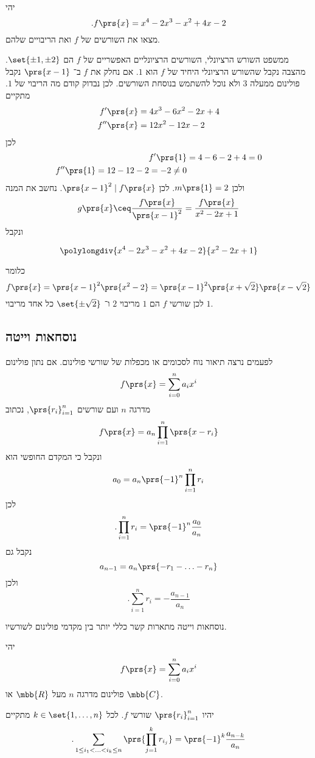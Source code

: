 \documentclass[article, 10pt,oneside]{article}
\begin{document}
\begin{exercise}
יהי
\[\text{.} f\prs{x} = x^4 - 2x^3 - x^2 + 4x - 2\]
מצאו את השורשים של
$f$
ואת הריבויים שלהם.
\end{exercise}

\begin{solution}
ממשפט השורש הרציונלי, השורשים הרציונליים האפשריים של
$f$
הם
$\set{\pm 1, \pm 2}$.
מהצבה נקבל שהשורש הרציונלי היחיד של
$f$
הוא
$1$.
אם נחלק את
$f$
ב־%
$\prs{x-1}$
נקבל פולינום ממעלה
$3$
ולא נוכל להשתמש בנוסחת השורשים. לכן נבדוק קודם מה הריבוי של
$1$.
מתקיים
\begin{align*}
f'\prs{x} &= 4x^3 -6x^2 -2x + 4 \\
f''\prs{x} &= 12x^2 - 12x - 2
\end{align*}
לכן
\begin{align*}
f'\prs{1} &= 4-6-2 + 4 = 0 \\
f''\prs{1} = 12 - 12 - 2 = -2 \neq 0
\end{align*}
ולכן
$m\prs{1} = 2$.
לכן
$\prs{x-1}^2 \mid f\prs{x}$.
נחשב את המנה
\[g\prs{x} \ceq \frac{f\prs{x}}{\prs{x-1}^2} = \frac{f\prs{x}}{x^2 - 2x + 1}\]
ונקבל
\begin{otherlanguage}{english}
\[
\polylongdiv{x^4 - 2x^3 - x^2 + 4x - 2}{x^2 - 2x + 1}
\]
\end{otherlanguage}

כלומר
\[f\prs{x} = \prs{x-1}^2 \prs{x^2 - 2} = \prs{x-1}^2 \prs{x+\sqrt{2}}\prs{x-\sqrt{2}}\]
לכן שורשי
$f$
הם
$1$
מריבוי
$2$
ו־%
$\set{\pm \sqrt{2}}$
כל אחד מריבוי
$1$.
\end{solution}

\subsection*{נוסחאות וייטה}

לפעמים נרצה תיאור נוח לסכומים או מכפלות של שורשי פולינום.
אם נתון פולינום
\[f\prs{x} = \sum_{i = 0}^n a_i x^i\]
מדרגה
$n$
ועם שורשים
$\prs{r_i}_{i = 1}^n$,
נכתוב
\[f\prs{x} = a_n \prod_{i = 1}^n \prs{x-r_i}\]
ונקבל כי המקדם החופשי הוא
\[a_0 = a_n \prs{-1}^n \prod_{i=1}^n r_i\]
לכן
\[\text{.} \prod_{i=1}^n r_i = \prs{-1}^n \frac{a_0}{a_n} \]
נקבל גם
\[a_{n-1} = a_n\prs{-r_1 - \ldots - r_n}\]
ולכן
\[\text{.} \sum_{i=1}^n r_i = -\frac{a_{n-1}}{a_n}\]

נוסחאות וייטה מתארות קשר כללי יותר בין מקדמי פולינום לשורשיו.

\begin{theorem}
יהי
\[f\prs{x} = \sum_{i = 0}^n a_i x^i\]
פולינום מדרגה
$n$
מעל
$\mbb{R}$
או
$\mbb{C}$.

יהיו
$\prs{r_i}_{i = 1}^n$
שורשי
$f$.
לכל
$k \in \set{1, \ldots, n}$
מתקיים
\[\text{.} \sum_{1 \leq i_1 < \ldots < i_k \leq n} \prs{\prod_{j=1}^k r_{i_j}} = \prs{-1}^k \frac{a_{n-k}}{a_n}\]
\end{theorem}
\end{document}
